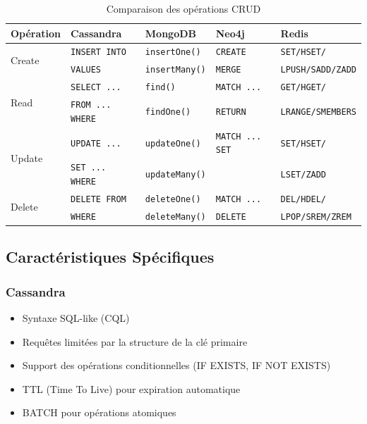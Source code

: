 \documentclass[11pt,a4paper]{article}
\begin{document}
\begin{table}[h]
\centering
\small
\begin{tabular}{|l|p{3cm}|p{3cm}|p{3cm}|p{3cm}|}
\hline
\textbf{Opération} & \textbf{Cassandra} & \textbf{MongoDB} & \textbf{Neo4j} & \textbf{Redis} \\
\hline
\multirow{2}{*}{Create} & \texttt{INSERT INTO} & \texttt{insertOne()} & \texttt{CREATE} & \texttt{SET/HSET/} \\
& \texttt{VALUES} & \texttt{insertMany()} & \texttt{MERGE} & \texttt{LPUSH/SADD/ZADD} \\
\hline
\multirow{2}{*}{Read} & \texttt{SELECT ...} & \texttt{find()} & \texttt{MATCH ...} & \texttt{GET/HGET/} \\
& \texttt{FROM ... WHERE} & \texttt{findOne()} & \texttt{RETURN} & \texttt{LRANGE/SMEMBERS} \\
\hline
\multirow{2}{*}{Update} & \texttt{UPDATE ...} & \texttt{updateOne()} & \texttt{MATCH ... SET} & \texttt{SET/HSET/} \\
& \texttt{SET ... WHERE} & \texttt{updateMany()} & & \texttt{LSET/ZADD} \\
\hline
\multirow{2}{*}{Delete} & \texttt{DELETE FROM} & \texttt{deleteOne()} & \texttt{MATCH ...} & \texttt{DEL/HDEL/} \\
& \texttt{WHERE} & \texttt{deleteMany()} & \texttt{DELETE} & \texttt{LPOP/SREM/ZREM} \\
\hline
\end{tabular}
\caption{Comparaison des opérations CRUD}
\end{table}

\subsection{Caractéristiques Spécifiques}

\subsubsection{Cassandra}

\begin{itemize}
    \item Syntaxe SQL-like (CQL)
    \item Requêtes limitées par la structure de la clé primaire
    \item Support des opérations conditionnelles (IF EXISTS, IF NOT EXISTS)
    \item TTL (Time To Live) pour expiration automatique
    \item BATCH pour opérations atomiques
\end{itemize}
\end{document}
